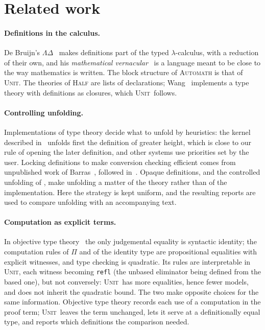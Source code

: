 \documentclass[11pt]{article}
\newcommand{\sys}{\textsc{Unit}}
\newcommand{\kw}[1]{\texttt{#1}}
\begin{document}
\section{Related work}\label{sec:related}

\paragraph{Definitions in the calculus.} De Bruijn's
$\Lambda\Delta$~\cite{LD} makes definitions part of the typed
$\lambda$-calculus, with a reduction of their own, and his
\emph{mathematical vernacular}~\cite{MV} is a language meant to be close
to the way mathematics is written. The block structure of
\textsc{Automath} is that of \sys. The theories of \textsc{Half}
\cite{Ced} are lists of declarations; Wang~\cite{Wang} implements a type
theory with definitions as closures, which \sys\ follows.

\paragraph{Controlling unfolding.} Implementations of type theory decide
what to unfold by heuristics: the kernel described in~\cite{Lean4} unfolds
first the definition of greater height, which is close to our rule of
opening the later definition, and other systems use priorities set by
the user. Locking definitions to make conversion checking efficient
comes from unpublished work of Barras~\cite{Barras}, followed
in~\cite{Wang}. Opaque definitions, and the controlled unfolding of
\cite{CU}, make unfolding a matter of the theory rather than of the
implementation. Here the strategy is kept uniform, and the resulting
reports are used to compare unfolding with an accompanying text.

\paragraph{Computation as explicit terms.} In objective type
theory~\cite{OTT} the only judgemental equality is syntactic identity;
the computation rules of $\Pi$ and of the identity type are
propositional equalities with explicit witnesses, and type checking is
quadratic. Its rules are interpretable in \sys, each witness becoming
\kw{refl} (the unbased eliminator being defined from the based one),
but not conversely: \sys\ has more equalities, hence fewer models, and
does not inherit the quadratic bound. The two make opposite choices for
the same information. Objective type theory records each use of a
computation in the proof term; \sys\ leaves the term unchanged, lets it
serve at a definitionally equal type, and reports which definitions the
comparison needed.
\end{document}
